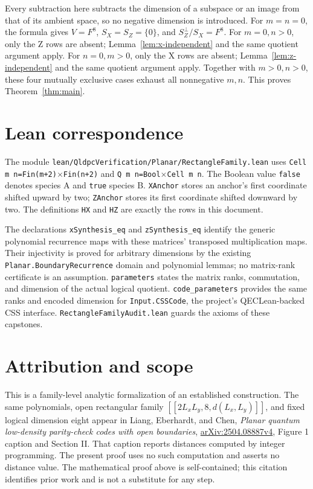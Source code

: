 \documentclass{article}
\begin{document}
Every subtraction here subtracts the dimension of a subspace or an image
from that of its ambient space, so no negative dimension is introduced.
For \(m=n=0\), the formula gives \(V=F^8\), \(S_X=S_Z=\{0\}\), and
\(S_Z^\perp/S_X=F^8\). For \(m=0,n>0\), only the Z rows are absent;
Lemma~\ref{lem:x-independent} and the same quotient argument apply. For \(n=0,m>0\),
only the X rows are absent; Lemma~\ref{lem:z-independent} and the same quotient
argument apply. Together with \(m>0,n>0\), these four mutually exclusive cases exhaust
all nonnegative \(m,n\). This proves Theorem~\ref{thm:main}.

\section{Lean correspondence}\label{sec:lean}

\begin{sloppypar}
The module \texttt{lean/QldpcVerification/Planar/RectangleFamily.lean} uses
\texttt{Cell m n=Fin(m+2)\(\times\)Fin(n+2)} and
\texttt{Q m n=Bool\(\times\)Cell m n}. The Boolean value
\texttt{false} denotes species A and \texttt{true} species B. \texttt{XAnchor} stores
an anchor's first coordinate shifted upward by two; \texttt{ZAnchor} stores its first
coordinate shifted downward by two. The definitions \texttt{HX} and \texttt{HZ} are
exactly the rows in this document.
\end{sloppypar}

\begin{sloppypar}
The declarations \texttt{xSynthesis\_eq} and \texttt{zSynthesis\_eq} identify the
generic polynomial recurrence maps with these matrices' transposed multiplication
maps. Their injectivity is proved for arbitrary dimensions by the existing
\texttt{Planar.BoundaryRecurrence} domain and polynomial lemmas; no matrix-rank
certificate is an assumption. \texttt{parameters} states the matrix ranks,
commutation, and dimension of the actual logical quotient. \texttt{code\_parameters}
provides the same ranks and encoded dimension for \texttt{Input.CSSCode}, the
project's QECLean-backed CSS interface. \texttt{RectangleFamilyAudit.lean} guards the
axioms of these capstones.
\end{sloppypar}

\section{Attribution and scope}\label{sec:attribution}

This is a family-level analytic formalization of an established construction.
The same polynomials, open rectangular family \([[2L_xL_y,8,d(L_x,L_y)]]\), and
fixed logical dimension eight appear in Liang, Eberhardt, and Chen,
\emph{Planar quantum low-density parity-check codes with open boundaries},
\href{https://arxiv.org/html/2504.08887v4}{arXiv:2504.08887v4}, Figure 1 caption and
Section II. That caption reports distances computed by integer programming.
The present proof uses no such computation and asserts no distance value.
The mathematical proof above is self-contained; this citation identifies
prior work and is not a substitute for any step.
\end{document}
